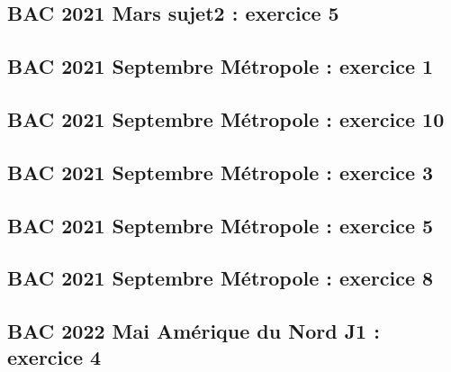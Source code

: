 \documentclass[lang=fr,edition=teacher,layout=sheet]{mxbook}
\begin{document}
\begingroup\endgroup
\par\bigskip
{}\subsection*{BAC 2021 Mars sujet2 : exercice 5}
\begingroup\endgroup
\par\bigskip
{}\subsection*{BAC 2021 Septembre Métropole : exercice 1}
\begingroup\endgroup
\par\bigskip
{}\subsection*{BAC 2021 Septembre Métropole : exercice 10}
\begingroup\endgroup
\par\bigskip
{}\subsection*{BAC 2021 Septembre Métropole : exercice 3}
\begingroup\endgroup
\par\bigskip
{}\subsection*{BAC 2021 Septembre Métropole : exercice 5}
\begingroup\endgroup
\par\bigskip
{}\subsection*{BAC 2021 Septembre Métropole : exercice 8}
\begingroup\endgroup
\par\bigskip
{}\subsection*{BAC 2022 Mai Amérique du Nord J1 : exercice 4}
\end{document}

